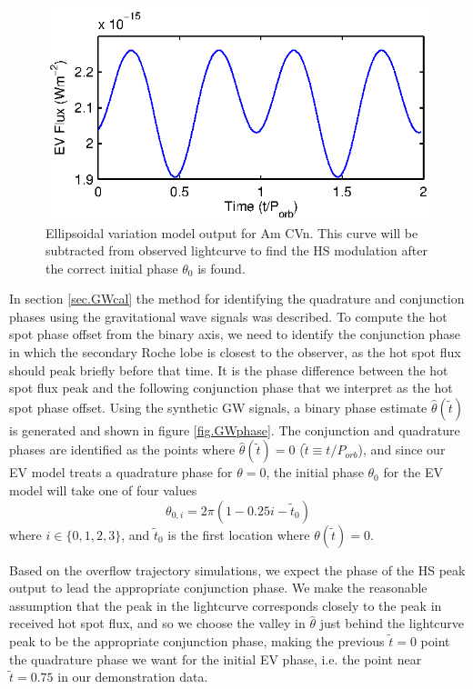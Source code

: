 \documentclass[preprint2]{aastex}
\begin{document}
\begin{figure}[h!]
\centering
\includegraphics[width=\columnwidth]{./figs/EV.eps}
\caption{Ellipsoidal variation model output for Am CVn. This curve will be subtracted from
observed lightcurve to find the HS modulation after the correct initial phase $\theta_0$ is found.}
\label{fig.EV}
\end{figure}


In section \ref{sec.GWcal} the method for identifying the quadrature and conjunction phases using the gravitational wave signals was described. To compute the hot spot phase offset from the binary axis, we need to identify the conjunction phase in which the secondary Roche lobe is closest to the observer, as  the hot spot flux should peak briefly before that time. It is the phase difference between the hot spot flux peak and the following conjunction phase that we interpret as the hot spot phase offset. Using the synthetic GW signals, a binary phase estimate $\hat{\theta}(\tilde{t})$ is generated and shown in
figure \ref{fig.GWphase}. The conjunction and quadrature phases are
identified as the points where $\hat{\theta}(\tilde{t}) = 0$ ($\tilde{t} \equiv t/P_{orb}$), and since our EV model treats a quadrature phase for $\theta=0$, the
initial phase $\theta_0$ for the EV model will take one of four values
\begin{equation}
   \theta_{0,i} = 2\pi(1-0.25i-\tilde{t}_0)
\end{equation}
where $i \in \lbrace 0,1,2,3 \rbrace$, and $\tilde{t}_0$ is the first location where
$\theta(\tilde{t})=0$.

 Based on the overflow trajectory simulations, we expect the
phase of the HS peak output to lead the appropriate conjunction
phase. We make the reasonable assumption that the peak in the lightcurve corresponds closely to the peak in received hot spot flux, and so we choose the valley in $\hat{\theta}$ just behind the lightcurve peak to be the appropriate conjunction phase, making the previous $\tilde{t}=0$ point the quadrature phase we want for the initial EV phase, i.e. the point near $\tilde{t}=0.75$ in our demonstration data.
\end{document}
